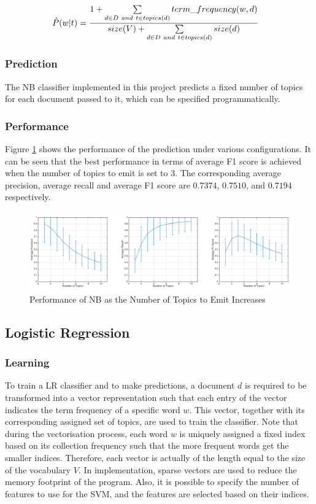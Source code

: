 \documentclass[11pt]{article}
\begin{document}
\begin{equation}
    \label{eq:nb-likelihoood}
    \begin{split}
        \hat{P}(w|t) & = \cfrac{1 + \sum\limits_{d\in D\ and\ t\in topics(d)} term\_frequency(w, d)}{size(V) + \sum\limits_{d\in D\ and\ t\in topics(d)} size(d)}
    \end{split}
\end{equation}


\subsubsection*{Prediction}
The NB classifier implemented in this project predicts a fixed number of topics for each document passed to it, which can be specified programmatically.

\subsubsection*{Performance}
Figure \ref{fig:nb} shows the performance of the prediction under various configurations. 
It can be seen that the best performance in terms of average F1 score is achieved when the number of topics to emit is set to $3$.
The corresponding average precision, average recall and average F1 score are $0.7374$, $0.7510$, and $0.7194$ respectively.

\begin{figure}[b]
\centering
    \centering
    \includegraphics[width=1\textwidth]{nb.png}
    \caption{Performance of NB as the Number of Topics to Emit Increases}
    \label{fig:nb}
\end{figure}

\subsection{Logistic Regression}
\subsubsection*{Learning}
To train a LR classifier and to make predictions, a document $d$ is required to be transformed into a vector representation such that each entry of the vector indicates the term frequency of a specific word $w$.
This vector, together with its corresponding assigned set of topics, are used to train the classifier.
Note that during the vectorisation process, each word $w$ is uniquely assigned a fixed index based on its collection frequency such that the more frequent words get the smaller indices.
Therefore, each vector is actually of the length equal to the size of the vocabulary $V$.
In implementation, sparse vectors are used to reduce the memory footprint of the program.
Also, it is possible to specify the number of features to use for the SVM, and the features are selected based on their indices.
\end{document}
